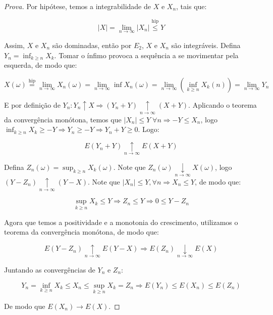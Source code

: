 \documentclass[
]{article}
\theoremstyle{definition}
\theoremstyle{definition}
\theoremstyle{definition}
\theoremstyle{definition}
\theoremstyle{remark}
\begin{document}
\begin{proof}[Prova]
Por hipótese, temos a integrabilidade de \(X\) e \(X_{n}\), tais que:

\begin{equation*}
|X| = \lim_{n \to \infty}|X_{n}| \stackrel{\mathrm{hip}}{\le} Y
\end{equation*}

Assim, \(X\) e \(X_{n}\) são dominadas, então por \(E_{2}\), \(X\) e \(X_{n}\) são integráveis. Defina \(Y_{n} = \inf_{k \ge n}X_{k}\). Tomar o ínfimo provoca a sequência a se movimentar pela esquerda, de modo que:

\begin{equation*}
X(\omega) \stackrel{\mathrm{hip}}{=}\lim_{n \to \infty}X_{n}(\omega) = \lim_{n \to \infty}\inf X_{n}(\omega) = \lim_{n \to \infty}\left(\inf_{k \ge n}X_{k}(n)\right) = \lim_{n \to \infty}Y_{n}
\end{equation*}

E por definição de \(Y_{n}:Y_{n} \uparrow X \Rightarrow (Y_{n} + Y) \underset{n \to \infty}{\uparrow} (X + Y)\). Aplicando o teorema da convergência monótona, temos que \(|X_{n}| \le Y \;\forall n \Rightarrow -Y \le X_{n}\), logo \(\inf_{k \ge n}X_{k} \ge -Y \Rightarrow Y_{n} \ge -Y \Rightarrow Y_{n} + Y \ge 0\). Logo:

\begin{equation*}
E(Y_{n} + Y) \underset{n \to \infty}{\uparrow} E(X + Y)
\end{equation*}

Defina \(Z_{n}(\omega) = \sup_{k \ge n}X_{k}(\omega)\). Note que \(Z_{n}(\omega) \underset{n \to \infty}{\downarrow} X(\omega)\), logo \((Y - Z_{n}) \underset{n \to \infty}{\uparrow} (Y - X)\). Note que \(|X_{n}| \le Y, \forall n \Rightarrow X_{n} \le Y\), de modo que:

\begin{equation*}
\sup_{k \ge n}X_{k} \le Y \Rightarrow Z_{n} \le Y \Rightarrow 0 \le Y - Z_{n}
\end{equation*}

Agora que temos a positividade e a monotonia do crescimento, utilizamos o teorema da convergência monótona, de modo que:

\begin{equation*}
E(Y - Z_{n}) \underset{n \to \infty}{\uparrow} E(Y - X) \Rightarrow E(Z_{n}) \underset{n \to \infty}{\downarrow} E(X)
\end{equation*}

Juntando as convergências de \(Y_{n}\) e \(Z_{n}\):

\begin{equation*}
Y_{n} = \inf_{k \ge n}X_{k} \le X_{n} \le \sup_{k \ge n}X_{k} = Z_{n} \Longrightarrow E(Y_{n}) \le E(X_{n}) \le E(Z_{n})
\end{equation*}

De modo que \(E(X_{n}) \to E(X)\).
\end{proof}
\end{document}
